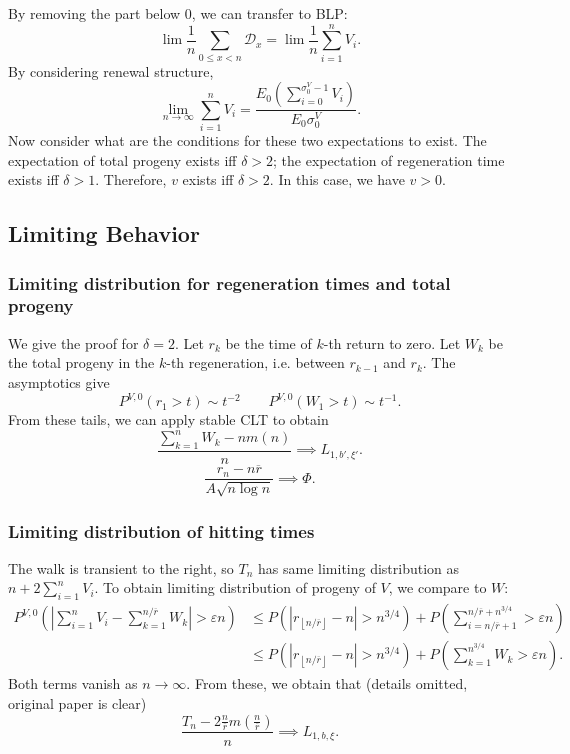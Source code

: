 By removing the part below $0$, we can transfer to BLP:
\[
	\lim \frac{1}{n} \sum _{0 \le  x < n} \mathcal{D}_x = \lim \frac{1}{n} \sum_{i = 1}^{n} V_i
.\] 
By considering renewal structure,
\[
	\lim_{n \to \infty } \sum_{i = 1}^n V_i
	= \frac{E_0\left( \sum _{i = 0}^{\sigma_0^V - 1} V_i \right) }{E_0 \sigma_0^V}
.\]
Now consider what are the conditions for these two expectations to exist. The expectation of total progeny exists iff $\delta > 2$; the expectation of regeneration time exists iff $\delta > 1$. Therefore, $v$ exists iff $\delta > 2$. In this case, we have $v > 0$.

\subsection{Limiting Behavior}

\subsubsection{Limiting distribution for regeneration times and total progeny}

We give the proof for $\delta = 2$. Let $r_k$ be the time of $k$-th return to zero. Let $W_k$ be the total progeny in the $k$-th regeneration, i.e. between $r_{k-1}$ and $r_k$. The asymptotics give
\[
	P^{V, 0}(r_1 > t) \sim t^{-2} \qquad P^{V, 0} (W_1 > t) \sim t^{-1}
.\] 
From these tails, we can apply stable CLT to obtain
\[
	\frac{\sum_{k = 1}^n W_k - n m(n)}{n} \implies L_{1, b', \xi'}
.\] 
\[
	\frac{r_n - n \overline{r} }{A \sqrt{n \log n} } \implies \Phi
.\] 

\subsubsection{Limiting distribution of hitting times}

The walk is transient to the right, so $T_n$ has same limiting distribution as $n + 2 \sum_{i = 1}^n V_i$. To obtain limiting distribution of progeny of $V$, we compare to $W$:
\begin{align*}
	P^{V, 0}\left( \left| \sum_{i = 1}^n V_i - \sum _{k = 1}^{n / \overline{r} } W_k \right| > \varepsilon n  \right) 
	&\leq P\left( \left| r_{\left\lfloor n / \overline{r}  \right\rfloor} - n \right| > n^{3 / 4} \right)  + P\left( \sum_{i = n / \overline{r}  + 1}^{n / \overline{r}  + n^{3 / 4}} > \varepsilon n \right) \\
	&\leq P\left( \left| r_{\left\lfloor n / \overline{r}  \right\rfloor} - n \right| > n^{3 / 4} \right)  + P\left( \sum_{k = 1}^{n^{3 / 4}} W_k > \varepsilon n \right)
.\end{align*} 
Both terms vanish as $n \to \infty $. From these, we obtain that (details omitted, original paper is clear)
\[
	\frac{T_n - 2 \frac{n}{\overline{r} }m(\frac{n}{\overline{r} })}{n} \implies L_{1, b, \xi}
.\] 

